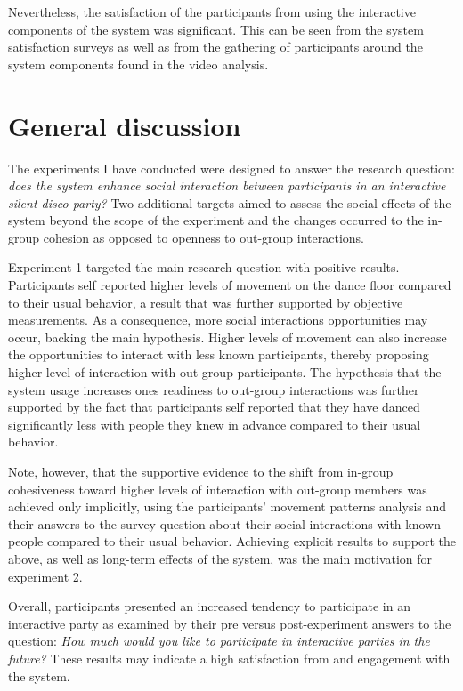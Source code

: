 \documentclass[a4paper,11pt]{article}
\begin{document}
{Nevertheless, the satisfaction of the participants from using the interactive components of the system was significant.
This can be seen from the system satisfaction surveys as well as from the gathering of participants around the system components found in the video analysis.

\section{General discussion}

The experiments I have conducted were designed to answer the research question: \emph{does the system enhance social interaction between participants in an interactive silent disco party?}
Two additional targets aimed to assess the social effects of the system beyond the scope of the experiment and the changes occurred to the in-group cohesion as opposed to openness to out-group interactions.

Experiment 1 targeted the main research question with positive results.
Participants self reported higher levels of movement on the dance floor compared to their usual behavior, a result that was further supported by objective measurements.
As a consequence, more social interactions opportunities may occur, backing the main hypothesis.
Higher levels of movement can also increase the opportunities to interact with less known participants, thereby proposing higher level of interaction with out-group participants.
The hypothesis that the system usage increases ones readiness to out-group interactions was further supported by the fact that participants self reported that they have danced significantly less with people they knew in advance compared to their usual behavior.

Note, however, that the supportive evidence to the shift from in-group cohesiveness toward higher levels of interaction with out-group members was achieved only implicitly, using the participants' movement patterns analysis and their answers to the survey question about their social interactions with known people compared to their usual behavior.
Achieving explicit results to support the above, as well as long-term effects of the system, was the main motivation for experiment 2.

Overall, participants presented an increased tendency to participate in an interactive party as examined by their pre versus post-experiment answers to the question: \emph{How much would you like to participate in interactive parties in the future?}
These results may indicate a high satisfaction from and engagement with the system.

}
\end{document}
